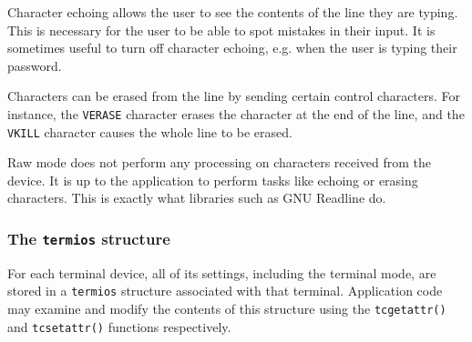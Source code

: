\documentclass[shortabstract, manyadvisors, english, mgr]{iithesis}
\begin{document}
Character echoing allows the user to see the contents of the line they are
typing. This is necessary for the user to be able to spot mistakes in their
input. It is sometimes useful to turn off character echoing, e.g. when the user
is typing their password.

Characters can be erased from the line by sending certain control characters.
For instance, the \texttt{VERASE} character erases the character at the end of
the line, and the \texttt{VKILL} character causes the whole line to be erased.

Raw mode does not perform any processing on characters received from the device.
It is up to the application to perform tasks like echoing or erasing characters.
This is exactly what libraries such as GNU Readline do.

\subsubsection{The \texttt{termios} structure}

For each terminal device, all of its settings, including the terminal mode, are
stored in a \texttt{termios} structure associated with that terminal.
Application code may examine and modify the contents of this structure using the
\texttt{tcgetattr()}\cite{tcgetattr} and \texttt{tcsetattr()}\cite{tcsetattr} functions respectively.
\end{document}

